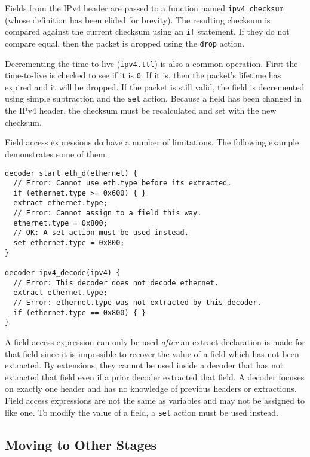 Fields from the IPv4 header are passed to a function named 
\texttt{ipv4\_checksum} (whose definition has been elided for brevity). The 
resulting checksum is compared against the current checksum using an \texttt{if} 
statement. If they do not compare equal, then the packet is dropped using the 
\texttt{drop} action.

Decrementing the time-to-live (\texttt{ipv4.ttl}) is also a common operation. 
First the time-to-live is checked to see if it is \texttt{0}. If it is, then the 
packet's lifetime has expired and it will be dropped. If the packet is still 
valid, the field is decremented using simple subtraction and the 
\texttt{set} action. Because a field has been changed in the IPv4 
header, the checksum must be recalculated and set with the new checksum.

Field access expressions do have a number of limitations. The following example
demonstrates some of them.

\begin{codepage}
\begin{lstlisting}
decoder start eth_d(ethernet) {
  // Error: Cannot use eth.type before its extracted.
  if (ethernet.type >= 0x600) { }
  extract ethernet.type;
  // Error: Cannot assign to a field this way.
  ethernet.type = 0x800;
  // OK: A set action must be used instead.
  set ethernet.type = 0x800;
}

decoder ipv4_decode(ipv4) {
  // Error: This decoder does not decode ethernet.
  extract ethernet.type;
  // Error: ethernet.type was not extracted by this decoder.
  if (ethernet.type == 0x800) { }
}
\end{lstlisting}
\end{codepage}

A field access expression can only be used \textit{after} an extract declaration
is made for that field since it is impossible to recover the value of a
field which has not been extracted. By extensions, they cannot be used inside a
decoder that has not extracted that field even if a prior decoder extracted that field. A decoder focuses on exactly one
header and has no knowledge of previous headers or extractions.
Field access expressions are not the same as variables and may not be assigned to like one. To modify the
value of a field, a \texttt{set} action must be used instead.

\subsection{Moving to Other Stages} \label{tut:decoder_next}

